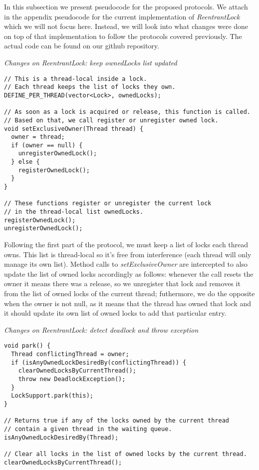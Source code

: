In this subsection we present pseudocode for the proposed protocols. We attach in the appendix pseudocode for the current implementation of \emph{ReentrantLock} which we will not focus here. Instead, we will look into what changes were done on top of that implementation to follow the protocols covered previously. The actual code can be found on our github repository.

\medskip
\noindent
{\it Changes on ReentrantLock: keep ownedLocks list updated}
\begin{verbatim}
// This is a thread-local inside a lock.
// Each thread keeps the list of locks they own.
DEFINE_PER_THREAD(vector<Lock>, ownedLocks);

// As soon as a lock is acquired or release, this function is called.
// Based on that, we call register or unregister owned lock.
void setExclusiveOwner(Thread thread) {
  owner = thread;
  if (owner == null) {
    unregisterOwnedLock();
  } else {
    registerOwnedLock();
  }
}

// These functions register or unregister the current lock
// in the thread-local list ownedLocks.
registerOwnedLock();
unregisterOwnedLock();
\end{verbatim}

Following the first part of the protocol, we must keep a list of locks each thread owns.
This list is thread-local so it's free from interference (each thread will only manage its own list). Method calls to \emph{setExclusiveOwner} are intercepted to also update the list of owned locks accordingly as follows: whenever the call resets the owner it means there was a release, so we unregister that lock and removes it from the list of owned locks of the current thread; futhermore, we do the opposite when the owner is not null, as it means that the thread has owned that lock and it should update its own list of owned locks to add that particular entry.

\medskip
\noindent
{\it Changes on ReentrantLock: detect deadlock and throw exception}
\begin{verbatim}
void park() {
  Thread conflictingThread = owner;
  if (isAnyOwnedLockDesiredBy(conflictingThread)) {
    clearOwnedLocksByCurrentThread();
    throw new DeadlockException();
  }
  LockSupport.park(this);
}

// Returns true if any of the locks owned by the current thread
// contain a given thread in the waiting queue.
isAnyOwnedLockDesiredBy(Thread);

// Clear all locks in the list of owned locks by the current thread.
clearOwnedLocksByCurrentThread();
\end{verbatim}

